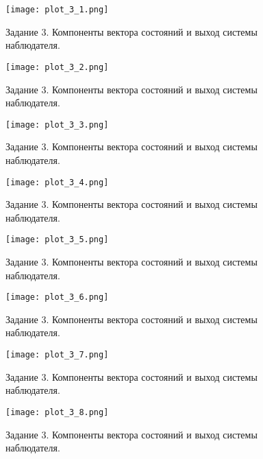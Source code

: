 \begin{figure}[]
    \centering
    \texttt{[image: plot\_3\_1.png]}
    \caption{\label{fig:The-caption-1}Задание 3. Компоненты вектора состояний и выход системы наблюдателя.}
\end{figure}
\begin{figure}[]
    \centering
    \texttt{[image: plot\_3\_2.png]}
    \caption{\label{fig:The-caption-1}Задание 3. Компоненты вектора состояний и выход системы наблюдателя.}
\end{figure}
\begin{figure}[]
    \centering
    \texttt{[image: plot\_3\_3.png]}
    \caption{\label{fig:The-caption-1}Задание 3. Компоненты вектора состояний и выход системы наблюдателя.}
\end{figure}
\begin{figure}[]
    \centering
    \texttt{[image: plot\_3\_4.png]}
    \caption{\label{fig:The-caption-1}Задание 3. Компоненты вектора состояний и выход системы наблюдателя.}
\end{figure}
\begin{figure}[]
    \centering
    \texttt{[image: plot\_3\_5.png]}
    \caption{\label{fig:The-caption-1}Задание 3. Компоненты вектора состояний и выход системы наблюдателя.}
\end{figure}
\begin{figure}[]
    \centering
    \texttt{[image: plot\_3\_6.png]}
    \caption{\label{fig:The-caption-1}Задание 3. Компоненты вектора состояний и выход системы наблюдателя.}
\end{figure}
\begin{figure}[]
    \centering
    \texttt{[image: plot\_3\_7.png]}
    \caption{\label{fig:The-caption-1}Задание 3. Компоненты вектора состояний и выход системы наблюдателя.}
\end{figure}
\begin{figure}[]
    \centering
    \texttt{[image: plot\_3\_8.png]}
    \caption{\label{fig:The-caption-1}Задание 3. Компоненты вектора состояний и выход системы наблюдателя.}
\end{figure}
\pagebreak

